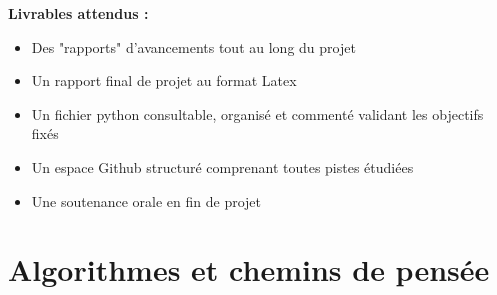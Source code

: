 \documentclass{article}
\begin{document}
    \noindent\textbf{Livrables attendus :}
    \begin{itemize}
        \item Des "rapports" d'avancements tout au long du projet
        \item Un rapport final de projet au format Latex
        \item Un fichier python consultable, organisé et commenté validant les objectifs fixés
        \item Un espace Github structuré comprenant toutes pistes étudiées
        \item Une soutenance orale en fin de projet\\
    \end{itemize}


\newpage
\section{Algorithmes et chemins de pensée}
\end{document}
